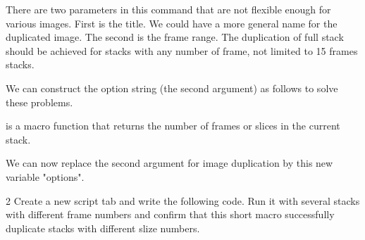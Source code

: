 There are two parameters in this command that are not flexible enough for various images. First is the title. We could have a more general name for the duplicated image. The second is the frame range.  The duplication of full stack should be achieved for stacks with any number of frame, not limited to 15 frames stacks.

We can construct the option string (the second argument) as follows to solve these problems.


 is a macro function that returns the number of frames or slices in the current stack.

We can now replace the second argument for image duplication by this new variable "options".


\begin{indentexercise}
{2}
Create a new script tab and write the following code. Run it with several stacks with different frame numbers and confirm that this short macro successfully duplicate stacks with different slize numbers.
\end{indentexercise}